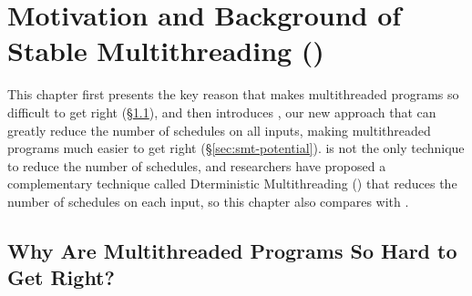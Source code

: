 \chapter{Motivation and Background of Stable Multithreading (\smt)}
\label{sec:smt-motivation}

This chapter first presents the key reason that makes multithreaded programs so
difficult to get right (\S\ref{sec:smt-why}), and then introduces
\smt, our new approach that can greatly reduce the number of schedules on all
inputs, making multithreaded programs much easier to get right
(\S\ref{sec:smt-potential}). \smt is not the only technique to reduce the number
of schedules, and researchers have proposed a complementary technique called
Dterministic Multithreading (\dmt) that reduces the number of schedules
on each input, so this chapter also compares \smt with \dmt.

\section{Why Are Multithreaded Programs So Hard to Get Right?}
\label{sec:smt-why}

